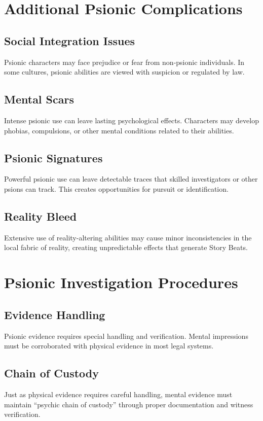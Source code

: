 \documentclass[11pt,twoside]{article}
\begin{document}
\section*{Additional Psionic Complications}

\subsection*{Social Integration Issues}
Psionic characters may face prejudice or fear from non-psionic individuals. In some cultures, psionic abilities are viewed with suspicion or regulated by law.

\subsection*{Mental Scars}
Intense psionic use can leave lasting psychological effects. Characters may develop phobias, compulsions, or other mental conditions related to their abilities.

\subsection*{Psionic Signatures}
Powerful psionic use can leave detectable traces that skilled investigators or other psions can track. This creates opportunities for pursuit or identification.

\subsection*{Reality Bleed}
Extensive use of reality-altering abilities may cause minor inconsistencies in the local fabric of reality, creating unpredictable effects that generate Story Beats.

\section*{Psionic Investigation Procedures}

\subsection*{Evidence Handling}
Psionic evidence requires special handling and verification. Mental impressions must be corroborated with physical evidence in most legal systems.

\subsection*{Chain of Custody}
Just as physical evidence requires careful handling, mental evidence must maintain ``psychic chain of custody'' through proper documentation and witness verification.
\end{document}
